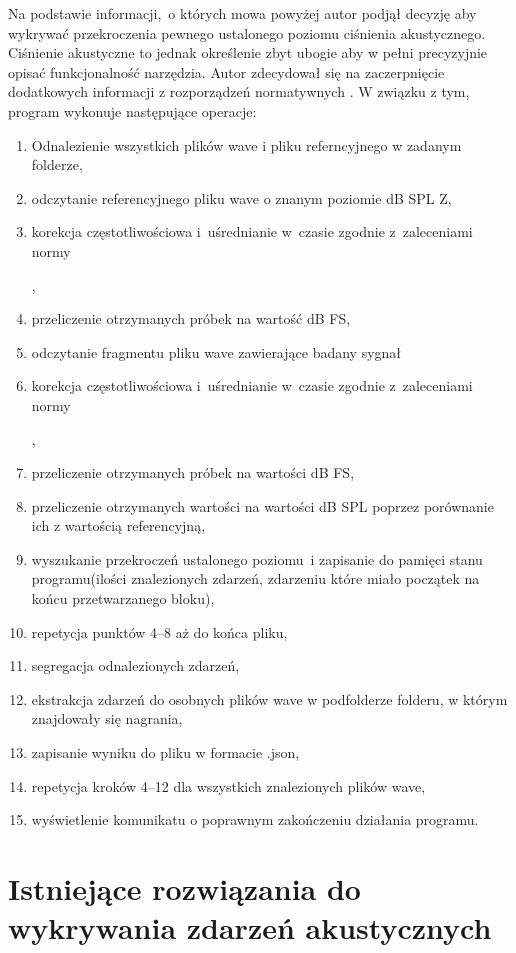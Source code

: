 \documentclass[eng,printmode]{mgr}
\begin{document}
Na podstawie informacji,~o których mowa powyżej autor podjął decyzję aby wykrywać przekroczenia pewnego ustalonego poziomu ciśnienia akustycznego. Ciśnienie akustyczne to jednak określenie zbyt ubogie aby w pełni precyzyjnie opisać funkcjonalność narzędzia. Autor zdecydował się na zaczerpnięcie dodatkowych informacji z rozporządzeń normatywnych \cite{PN-EN_61672-1:2014-03}. W związku z tym, program wykonuje następujące operacje:
\begin{enumerate}
\item Odnalezienie wszystkich plików wave i pliku referncyjnego w zadanym folderze,
\item odczytanie referencyjnego pliku wave o znanym poziomie dB SPL Z,
\item korekcja częstotliwościowa i~uśrednianie w~czasie zgodnie z~zaleceniami normy
  
\cite{PN-EN_61672-1:2014-03},
\item przeliczenie otrzymanych próbek na wartość dB FS,
\item odczytanie fragmentu pliku wave zawierające badany sygnał
\item korekcja częstotliwościowa i~uśrednianie w~czasie zgodnie z~zaleceniami normy 

\cite{PN-EN_61672-1:2014-03},
\item przeliczenie otrzymanych próbek na wartości dB FS,
\item przeliczenie otrzymanych wartości na wartości dB SPL poprzez porównanie ich z wartością referencyjną,
\item wyszukanie przekroczeń ustalonego poziomu~i zapisanie do pamięci stanu programu(ilości znalezionych zdarzeń, zdarzeniu które miało początek na końcu przetwarzanego bloku),
\item repetycja punktów 4--8 aż do końca pliku,
\item segregacja odnalezionych zdarzeń,
\item ekstrakcja zdarzeń do osobnych plików wave w podfolderze folderu, w którym znajdowały się nagrania,
\item zapisanie wyniku do pliku w formacie .json,
\item repetycja kroków 4--12 dla wszystkich znalezionych plików wave,
\item wyświetlenie komunikatu o poprawnym zakończeniu działania programu.
\end{enumerate}
\section{Istniejące rozwiązania do wykrywania zdarzeń akustycznych}
\end{document}
